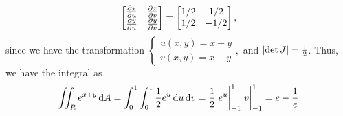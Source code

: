 \documentclass[8pt,twocolumn]{article}
\begin{document}
\begin{Answer}[number=22]
\[{\begin{bmatrix}
      \pdv{x}{u}&\pdv{x}{v}\\
      \pdv{y}{u}&\pdv{y}{v}
    \end{bmatrix}}=
    \begin{bmatrix}1/2&1/2\\1/2&-1/2\end{bmatrix},
  \]
  since we have the transformation
  \(
    \begin{cases}
      u(x,y) = x+y \\
      v(x,y) = x-y
    \end{cases},
  \)
  and $\abs{\det J} = \frac{1}{2}$.
  Thus, we have the integral as
  \[
    \iint_R e^{x+y} \dd{A} = \int_0^1\int_0^1\frac{1}{2} e^u\dd{u}\dd{v} =
    \frac{1}{2}\eval{e^u}_{-1}^1 \eval{v}_{-1}^1 = e - \frac{1}{e}
  \]
\end{Answer}
\end{document}
